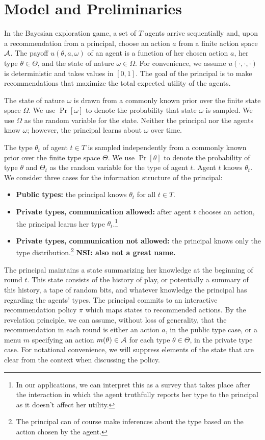 \section{Model and Preliminaries}

In the Bayesian exploration game, a set of $T$ agents arrive sequentially and, upon a recommendation from a principal, choose an action $a$ from a finite action space $\mathcal{A}$.  The payoff $u(\theta,a,\omega)$ of an agent is a function of her chosen action $a$, her type $\theta\in\varTheta$, and the state of nature $\omega\in\varOmega$.  For convenience, we assume $u(\cdot,\cdot,\cdot)$ is deterministic and takes values in $[0,1]$.  The goal of the principal is to make recommendations that maximize the total expected utility of the agents.

The state of nature $\omega$ is drawn from a commonly known prior over the finite state space $\varOmega$. We use $\Pr[\omega]$ to denote the probability that state $\omega$ is sampled. We use $\Omega$ as the random variable for the state.  Neither the principal nor the agents know $\omega$; however, the principal learns about $\omega$ over time.

The type $\theta_t$ of agent $t\in T$ is sampled independently from a commonly known prior over the finite type space $\varTheta$. We use $\Pr[\theta]$ to denote the probability of type $\theta$ and $\Theta_t$ as the random variable for the type of agent $t$.  Agent $t$ knows $\theta_t$.  We consider three cases for the information structure of the principal:
\begin{itemize}
	\item \textbf{Public types:} the principal knows $\theta_t$ for all $t\in T$.
	\item \textbf{Private types, communication allowed:} after agent $t$ chooses an action, the principal learns her type $\theta_t$.\footnote{In our applications, we can interpret this as a survey that takes place after the interaction in which the agent truthfully reports her type to the principal as it doesn't affect her utility.}
	\item \textbf{Private types, communication not allowed:} the principal knows only the type distribution.\footnote{The principal can of course make inferences about the type based on the action chosen by the agent.} {\bf NSI: also not a great name.}
\end{itemize}

The principal maintains a state summarizing her knowledge at the beginning of round $t$.  This state consists of the history of play, or potentially a summary of this history, a tape of random bits, and whatever knowledge the principal has regarding the agents' types.  The principal commits to an interactive recommendation policy $\pi$ which maps states to recommended actions. By the revelation principle, we can assume, without loss of generality, that the recommendation in each round is either an action $a$, in the public type case, or a menu $m$ specifying an action $m(\theta)\in\mathcal{A}$ for each type $\theta\in\varTheta$, in the private type case. For notational convenience, we will suppress elements of the state that are clear from the context when discussing the policy.

